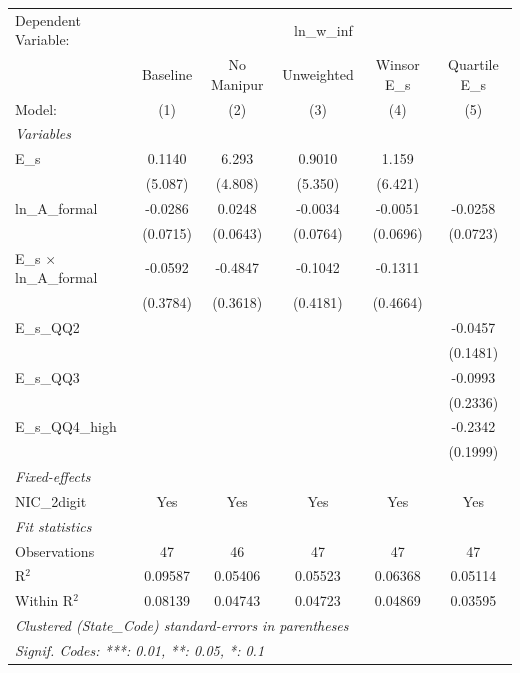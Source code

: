 
\begingroup
\centering
\begin{tabular}{lccccc}
   \tabularnewline \midrule \midrule
   Dependent Variable: & \multicolumn{5}{c}{ln\_w\_inf}\\
                                   & Baseline & No Manipur & Unweighted & Winsor E\_s  & Quartile E\_s \\    
   Model:                          & (1)      & (2)        & (3)        & (4)          & (5)\\  
   \midrule
   \emph{Variables}\\
   E\_s                            & 0.1140   & 6.293      & 0.9010     & 1.159        &   \\   
                                   & (5.087)  & (4.808)    & (5.350)    & (6.421)      &   \\   
   ln\_A\_formal                   & -0.0286  & 0.0248     & -0.0034    & -0.0051      & -0.0258\\   
                                   & (0.0715) & (0.0643)   & (0.0764)   & (0.0696)     & (0.0723)\\   
   E\_s $\times$ ln\_A\_formal     & -0.0592  & -0.4847    & -0.1042    & -0.1311      &   \\   
                                   & (0.3784) & (0.3618)   & (0.4181)   & (0.4664)     &   \\   
   E\_s\_QQ2                       &          &            &            &              & -0.0457\\   
                                   &          &            &            &              & (0.1481)\\   
   E\_s\_QQ3                       &          &            &            &              & -0.0993\\   
                                   &          &            &            &              & (0.2336)\\   
   E\_s\_QQ4\_high                 &          &            &            &              & -0.2342\\   
                                   &          &            &            &              & (0.1999)\\   
   \midrule
   \emph{Fixed-effects}\\
   NIC\_2digit                     & Yes      & Yes        & Yes        & Yes          & Yes\\  
   \midrule
   \emph{Fit statistics}\\
   Observations                    & 47       & 46         & 47         & 47           & 47\\  
   R$^2$                           & 0.09587  & 0.05406    & 0.05523    & 0.06368      & 0.05114\\  
   Within R$^2$                    & 0.08139  & 0.04743    & 0.04723    & 0.04869      & 0.03595\\  
   \midrule \midrule
   \multicolumn{6}{l}{\emph{Clustered (State\_Code) standard-errors in parentheses}}\\
   \multicolumn{6}{l}{\emph{Signif. Codes: ***: 0.01, **: 0.05, *: 0.1}}\\
\end{tabular}
\par\endgroup


